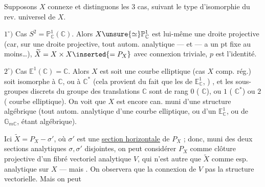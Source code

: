 Supposons $X$ connexe et distinguons les 3 cas, suivant le type d'isomorphie du rev. universel de $X$.

$1^\circ)$ Cas $S^2=\mathbb P^1_{\mathbb C}(\mathbb C)$. Alors $X\unsure{\simeq}\mathbb P^1_{\mathbb C}$ est lui-même une droite projective (car, sur une droite projective, tout autom. analytique --- et  --- a un pt fixe au moins\ldots), $\widetilde X=X\times X\inserted{=P_X}$ avec connexion triviale, $p$ est l'identité.

$2^\circ)$ Cas $\mathbb E^1(\mathbb C)=\mathbb C$. Alors $X$ est soit  une courbe elliptique (cas $X$ comp. rég.) soit isomorphe à $\mathbb C$, ou à $\mathbb C^*$ (cela provient du fait que les  de  $\mathbb E^1_{\mathbb C}$, )  , et les sous-groupes discrets  du groupe des translations $\mathbb C$ sont de rang $0$ ( $\mathbb C$), ou $1$ ( $\mathbb C^*$) ou $2$ ( courbe elliptique). On voit que $X$ est encore can. muni d'une structure algébrique (tout autom. analytique d'une courbe elliptique, ou d'un $\mathbb E^1_{\mathbb C}$, ou de $\mathbb G_{m\mathbb C}$, étant algébrique).


Ici $\widetilde X=P_X-\sigma'$, où $\sigma'$ est une \uline{section horizontale} de $P_X$ ; donc,  muni des deux sections analytiques $\sigma,\sigma'$ disjointes, on peut considérer $P_X$ comme clôture projective d'un fibré vectoriel analytique $V$, qui n'est autre que $\widetilde X$ comme esp. analytique sur $X$ --- mais . On observera que la connexion de $V$   pas la structure vectorielle. Mais on peut
